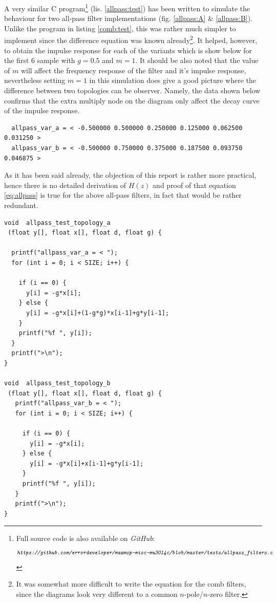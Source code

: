 \documentclass[12pt]{report}
\newcommand{\URL}[1]{\[ \texttt{\emph{#1}} \]}
\newcommand{\href}[2]{#2 (\texttt{\emph{\url{#1}}})} %
\newcommand{\Href}[2]{{#2}} %
\newcommand{\Href}[2]{\href{#1}{#2}} %
\newcommand{\URL}[1]{\[ \Href{#1}{\texttt{\emph{#1}}} \]}
\begin{document}
  A very similar C program\footnote{Full source code is also available on \emph{GitHub}:
  \URL{https://github.com/errordeveloper/maxmsp-misc-mu3014c/blob/master/tests/allpass\_filters.c}}
  (lis. \ref{allpass:test}) has been written to simulate the behaviour for two all-pass
  filter implementations (fig. \ref{allpass:A} \& \ref{allpass:B}). Unlike the program
  in listing \ref{comb:test}, this was rather much simpler to implement since
  the difference equation was known already\footnote{It was somewhat more
  difficult to write the equation for the comb filters, since the diagrams
  look very different to a common $n$-pole/$n$-zero filter.}. It helped,
  however, to obtain the impulse response for each of the variants which is
  show below for the first 6 sample with $g=0.5$ and $m=1$. It should be also
  noted that the value of $m$ will affect the frequency response of the filter
  and it's impulse response, nevertheless setting $m=1$ in this simulation
  does give a good picture where the difference between two topologies can be
  observer. Namely, the data shown below confirms that the extra multiply node
  on the diagram only affect the decay curve of the impulse response.
  \begin{verbatim}
  allpass_var_a = < -0.500000 0.500000 0.250000 0.125000 0.062500 0.031250 >
  allpass_var_b = < -0.500000 0.750000 0.375000 0.187500 0.093750 0.046875 >
  \end{verbatim}
  As it has been said already, the objection of this report is rather more
  practical, hence there is no detailed derivation of $H(z)$ and proof of
  that equation \ref{eq:allpass} is true for the above all-pass filters,
  in fact that would be rather redundant.
  \pagebreak
{}
\begin{lstlisting}
void  allpass_test_topology_a
 (float y[], float x[], float d, float g) {

  printf("allpass_var_a = < ");
  for (int i = 0; i < SIZE; i++) {
  
    if (i == 0) { 
      y[i] = -g*x[i];
    } else {
      y[i] = -g*x[i]+(1-g*g)*x[i-1]+g*y[i-1];
    }
    printf("%f ", y[i]);
  }
  printf(">\n");
}

void  allpass_test_topology_b
 (float y[], float x[], float d, float g) {
   printf("allpass_var_b = < ");
   for (int i = 0; i < SIZE; i++) {

     if (i == 0) { 
       y[i] = -g*x[i];
     } else {
       y[i] = -g*x[i]+x[i-1]+g*y[i-1];
     }
     printf("%f ", y[i]);
   }
   printf(">\n");
}
\end{lstlisting}
\pagebreak

\end{document}
